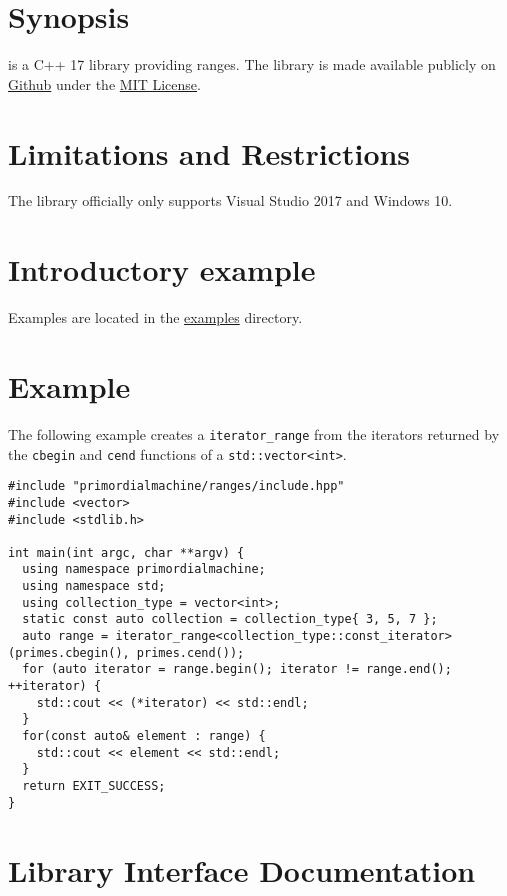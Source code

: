 \documentclass[oneside]{book}
\begin{document}
\maketitle
\tableofcontents
\chapter{Synopsis}
\textit{\GetOrganization{} \GetLibraryName} is a C++ 17 library providing ranges.
The library is made available publicly on
\href{\GetLibraryRepository}{Github}
under the
\href{\GetLibraryRepository/blob/master/LICENSE}{MIT License}.

\chapter{Limitations and Restrictions}
The library officially only supports Visual Studio 2017 and Windows 10.

\chapter{Introductory example}
Examples are located in the \href{\GetLibraryRepository/blob/master/examples}{examples} directory.



\chapter{Example}
The following example creates a \verb+iterator_range+ from the iterators returned by the
\verb+cbegin+ and \verb+cend+ functions of a \verb+std::vector<int>+.
\begin{verbatim}
#include "primordialmachine/ranges/include.hpp"
#include <vector>
#include <stdlib.h>

int main(int argc, char **argv) {
  using namespace primordialmachine;
  using namespace std;
  using collection_type = vector<int>;
  static const auto collection = collection_type{ 3, 5, 7 };
  auto range = iterator_range<collection_type::const_iterator>(primes.cbegin(), primes.cend());
  for (auto iterator = range.begin(); iterator != range.end(); ++iterator) {
    std::cout << (*iterator) << std::endl;
  }
  for(const auto& element : range) {
    std::cout << element << std::endl;
  }
  return EXIT_SUCCESS;
}
\end{verbatim}


\chapter{Library Interface Documentation}
\end{document}
